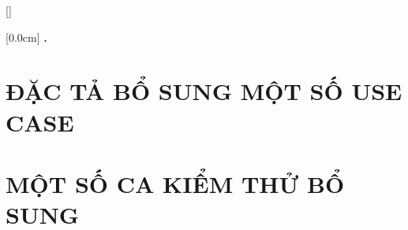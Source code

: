 \documentclass[a4paper,13pt,3p,twoside]{report}
\renewcommand{\bibname}{Danh_sach_tai_lieu_tham_khao}
\theoremstyle{definition}
\begin{document}
\newpage
\renewcommand\bibname{TÀI LIỆU THAM KHẢO}
\printbibliography{}

\appendixpage{}
\appendices{}
\addappheadtotoc{}


{}[]
\titlespacing*{\chapter}{0pt}{-20pt}{20pt}

    [0.0cm]             %
    {\bfseries\vspace{0.3cm}}                  %
    {{\bfseries{\scshape} \thecontentslabel.\ }} %
    {}         %
    {\contentspage}         %
\chapter{ĐẶC TẢ BỔ SUNG MỘT SỐ USE CASE}

\newpage
\chapter{MỘT SỐ CA KIỂM THỬ BỔ SUNG}

\end{document}
